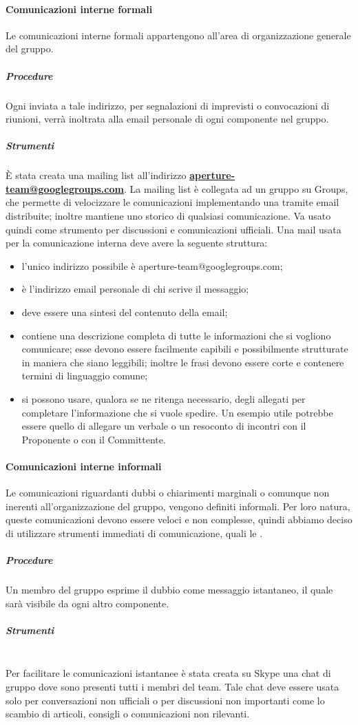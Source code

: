 \paragraph{Comunicazioni interne formali}
Le comunicazioni interne formali appartengono all'area di organizzazione generale del gruppo. 
\subparagraph{Procedure}
Ogni  inviata a tale indirizzo, per segnalazioni di imprevisti o convocazioni di riunioni, verrà inoltrata alla email personale di ogni componente nel gruppo.
\subparagraph{Strumenti}
È stata creata una mailing list all'indirizzo \textbf{\url{aperture-team@googlegroups.com}}.
La mailing list è collegata ad un gruppo su  Groups, che permette di velocizzare le comunicazioni implementando una  tramite email distribuite; inoltre mantiene uno storico di qualsiasi comunicazione. Va usato quindi come strumento per discussioni e comunicazioni ufficiali.
Una mail usata per la comunicazione interna deve avere la seguente struttura:
\begin{itemize}
\item {} l'unico indirizzo possibile è aperture-team@googlegroups.com;
\item {} è l'indirizzo email personale di chi scrive il messaggio;
\item {} deve essere una sintesi del contenuto della email;
\item {} contiene una descrizione completa di tutte le informazioni che si vogliono comunicare; esse devono essere facilmente capibili e possibilmente strutturate in maniera che siano leggibili; inoltre le frasi devono essere corte e contenere termini di linguaggio comune;
\item {} si possono usare, qualora se ne ritenga necessario, degli allegati per completare l'informazione che si vuole spedire. Un esempio utile potrebbe essere quello di allegare un verbale o un resoconto di incontri con il Proponente  o con il Committente.
\end{itemize}

\paragraph{Comunicazioni interne informali}
Le comunicazioni riguardanti dubbi o chiarimenti marginali o comunque non inerenti all'organizzazione del gruppo, vengono definiti informali. Per loro natura, queste comunicazioni devono essere veloci e non complesse, quindi abbiamo deciso di utilizzare strumenti immediati di comunicazione, quali le .
\subparagraph{Procedure}
Un membro del gruppo esprime il dubbio come messaggio istantaneo, il quale sarà visibile da ogni altro componente.
\subparagraph{Strumenti}
\subparagraph{} \hfill \\
Per facilitare le comunicazioni istantanee è stata creata su Skype una chat di gruppo dove sono presenti tutti i membri del team. Tale chat deve essere usata solo per conversazioni non ufficiali o per discussioni non importanti come lo scambio di articoli, consigli o comunicazioni non rilevanti.

